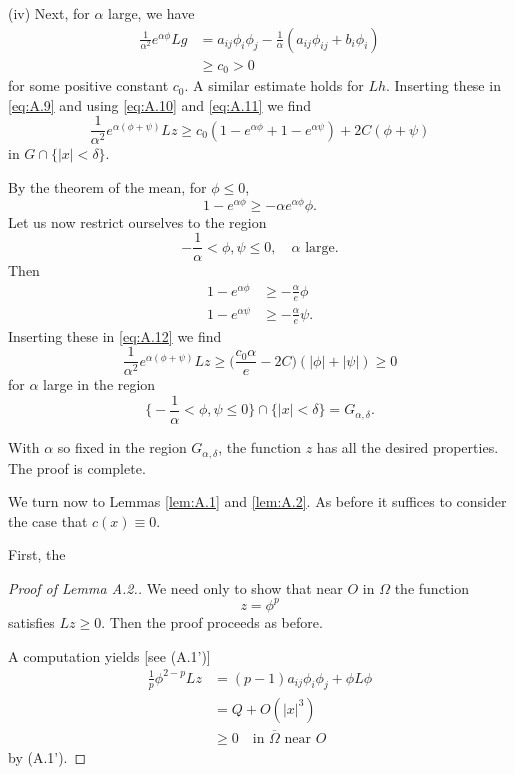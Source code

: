 (iv) Next, for $\alpha$ large, we have
\begin{align*}
  \frac{1}{\alpha^2} e^{\alpha\phi} Lg
  & = a_{ij}\phi_i\phi_j - \frac{1}{\alpha} (a_{ij}\phi_{ij}+b_i\phi_i) \\
  & \geq c_0>0
\end{align*}
for some positive constant $c_0$. A similar estimate holds for $Lh$.
Inserting these in \eqref{eq:A.9} and using \eqref{eq:A.10} and \eqref{eq:A.11}
we find
\begin{equation}\label{eq:A.12}
  \frac{1}{\alpha^2} e^{\alpha(\phi+\psi)}Lz
    \geq c_0 (1 - e^{\alpha\phi} + 1 - e^{\alpha\psi}) + 2C(\phi+\psi)
\end{equation}
in $G\cap\{|x|<\delta\}$.

By the theorem of the mean, for $\phi\leq 0$,
\[1 - e^{\alpha\phi} \geq -\alpha e^{\alpha\phi} \phi.\]
Let us now restrict ourselves to the region
\[-\frac{1}{\alpha} < \phi, \psi \leq 0,\quad \alpha\text{ large}.\]
Then
\begin{align*}
  1 - e^{\alpha\phi} & \geq -\frac{\alpha}{e} \phi \\
  1 - e^{\alpha\psi} & \geq -\frac{\alpha}{e} \psi.
\end{align*}
Inserting these in \eqref{eq:A.12} we find
\[\frac{1}{\alpha^2} e^{\alpha(\phi+\psi)} Lz
  \geq \biggl(\frac{c_0 \alpha}{e}-2C\biggr) (|\phi| + |\psi|) \geq 0\]
for $\alpha$ large in the region
\[\biggl\{-\frac{1}{\alpha} < \phi, \psi \leq 0\biggr\} \cap \{|x|<\delta\} = G_{\alpha, \delta}.\]

With $\alpha$ so fixed in the region $G_{\alpha,\delta}$,
the function $z$ has all the desired properties. The proof is complete.

We turn now to Lemmas \ref{lem:A.1} and \ref{lem:A.2}. As before it suffices to consider
the case that $c(x)\equiv 0$.

First, the
\begin{proof}[Proof of Lemma A.2.]
  We need only to show that near $O$ in $\Omega$ the function
  \[z = \phi^p\]
  satisfies $Lz\geq 0$. Then the proof proceeds as before.

  A computation yields [see (A.1')]
  \begin{align*}
    \frac{1}{p}\phi^{2-p}Lz
    & = (p-1)a_{ij}\phi_i\phi_j + \phi L\phi \\
    & = Q + O(|x|^3) \\
    & \geq 0 \quad \text{in } \overline{\Omega} \text{ near } O
  \end{align*}
  by (A.1').
\end{proof}

